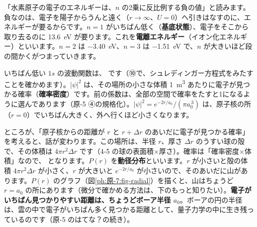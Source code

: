 \begin{phyomi}[$E_n=-13.6\ \mathrm{eV}/n^2$]
「水素原子の電子のエネルギーは、$n$ の2乗に反比例する負の値」と読みます。負なのは、電子を陽子からうんと遠く（$r\to\infty$、$U=0$）へ引きはなすのに、エネルギーが要るからです。$n=1$ がいちばん低く（\textbf{基底状態}）、電子をそこから取り去るのに \qty{13.6}{eV} が要ります。これを\textbf{電離エネルギー}（イオン化エネルギー）といいます。$n=2$ は \qty{-3.40}{eV}、$n=3$ は \qty{-1.51}{eV} で、$n$ が大きいほど段の間かくがつまっていきます。
\end{phyomi}

いちばん低い $1s$ の波動関数は、
\label{ph:原-7:psi1s}です（⑩で、シュレディンガー方程式をみたすことを確かめます）。$|\psi|^2$ は、その場所の小さな体積 \qty{1}{m^3} あたりに電子が見つかる確率（\textbf{確率密度}）です。前の係数は、全部の空間で確率をたすと1になるように選んであります（原-5 ④の規格化）。$|\psi|^2=e^{-2r/a_0}/(\pi a_0^{\,3})$ は、原子核の所（$r=0$）でいちばん大きく、外へ行くほど小さくなります。

ところが、「原子核からの距離が $r$ と $r+\Delta r$ のあいだに電子が見つかる確率」を考えると、話が変わります。この場所は、半径 $r$、厚さ $\Delta r$ のうすい球の殻で、その体積は $4\pi r^2\Delta r$ です（4-5 の球の表面積×厚さ）。確率は「確率密度×体積」なので、
となります。$P(r)$ を\textbf{動径分布}といいます。$r$ が小さいと殻の体積 $4\pi r^2\Delta r$ が小さく、$r$ が大きいと $e^{-2r/a_0}$ が小さいので、そのあいだに山があります。$P(r)$ のグラフ（図\ref{ph:原-7:fig-radial}）を描くと、山はちょうど $r=a_0$ の所にあります（微分で確かめる方法は、下のもっと知りたい）。\textbf{電子がいちばん見つかりやすい距離は、ちょうどボーア半径 $a_0$}。ボーアの円の半径は、雲の中で電子がいちばん多く見つかる距離として、量子力学の中に生き残っているのです（原-5 のはてな？の続き）。

